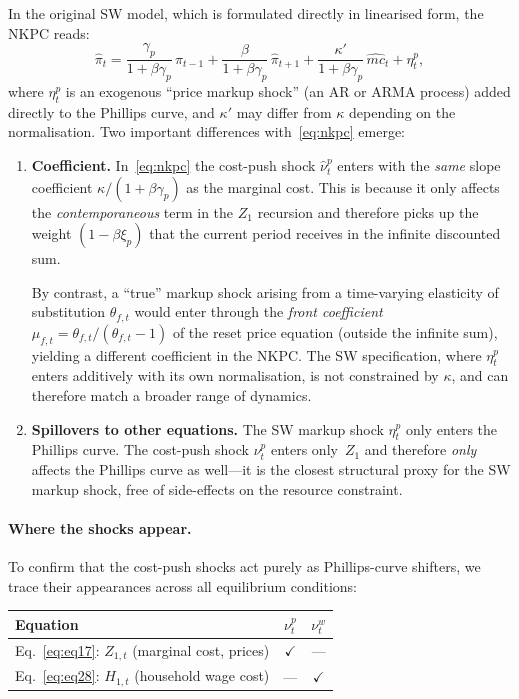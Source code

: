 \documentclass[11pt,a4paper]{article}
\begin{document}
In the original SW model, which is formulated directly in linearised
form, the NKPC reads:
\[
  \hat\pi_t
  = \frac{\gamma_p}{1+\beta\gamma_p}\,\hat\pi_{t-1}
  + \frac{\beta}{1+\beta\gamma_p}\,\hat\pi_{t+1}
  + \frac{\kappa'}{1+\beta\gamma_p}\,\widehat{mc}_t
  + \eta^p_t,
\]
where $\eta^p_t$ is an exogenous ``price markup shock'' (an AR or
ARMA process) added directly to the Phillips curve, and $\kappa'$
may differ from $\kappa$ depending on the normalisation. Two
important differences with~\eqref{eq:nkpc} emerge:
\begin{enumerate}[nosep]
\item \textbf{Coefficient.}
  In~\eqref{eq:nkpc} the cost-push shock $\hat\nu^p_t$ enters with the
  \emph{same} slope coefficient $\kappa/(1+\beta\gamma_p)$ as the
  marginal cost.  This is because it only affects the
  \emph{contemporaneous} term in the $Z_1$ recursion and therefore
  picks up the weight $(1-\beta\xi_p)$ that the current period receives
  in the infinite discounted sum.

  By contrast, a ``true'' markup shock arising from a time-varying
  elasticity of substitution $\theta_{f,t}$ would enter through the
  \emph{front coefficient} $\mu_{f,t} = \theta_{f,t}/(\theta_{f,t}-1)$
  of the reset price equation (outside the infinite sum), yielding a
  different coefficient in the NKPC. The SW specification, where
  $\eta^p_t$ enters additively with its own normalisation, is not
  constrained by $\kappa$, and can therefore match a broader range of
  dynamics.

\item \textbf{Spillovers to other equations.}
  The SW markup shock $\eta^p_t$ only enters the Phillips curve.
  The cost-push shock $\nu^p_t$ enters only~$Z_1$ and therefore
  \emph{only} affects the Phillips curve as well---it is the
  closest structural proxy for the SW markup shock, free of
  side-effects on the resource constraint.
\end{enumerate}

\paragraph{Where the shocks appear.}
To confirm that the cost-push shocks act purely as Phillips-curve
shifters, we trace their appearances across all equilibrium
conditions:

\begin{center}
\renewcommand{\arraystretch}{1.2}
\begin{tabular}{lcc}
\hline
\textbf{Equation} & $\nu^p_t$ & $\nu^w_t$ \\
\hline
Eq.~\eqref{eq:eq17}: $Z_{1,t}$ (marginal cost, prices)
  & $\checkmark$ & --- \\
Eq.~\eqref{eq:eq28}: $H_{1,t}$ (household wage cost)
  & --- & $\checkmark$ \\
\hline
\end{tabular}
\end{center}
\end{document}
